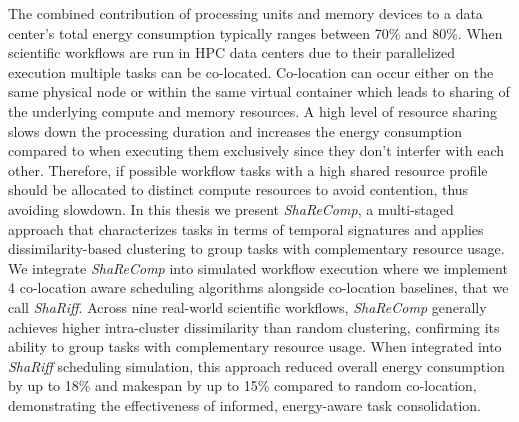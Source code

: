 \documentclass[a4paper, 11pt]{article}
\begin{document}
The combined contribution of processing units and memory devices to a data center's total energy consumption typically ranges between 70\% and 80\%. When scientific workflows are run in HPC data centers due to their parallelized execution multiple tasks can be co-located. Co-location can occur either on the same physical node or within the same virtual container which leads to sharing of the underlying compute and memory resources. A high level of resource sharing slows down the processing duration and increases the energy consumption compared to when executing them exclusively since they don't interfer with each other. Therefore, if possible workflow tasks with a high shared resource profile should be allocated to distinct compute resources to avoid contention, thus avoiding slowdown. In this thesis we present \textit{ShaReComp}, a multi-staged approach that characterizes tasks in terms of temporal signatures and applies dissimilarity-based clustering to group tasks with complementary resource usage. We integrate \textit{ShaReComp} into simulated workflow execution where we implement 4 co-location aware scheduling algorithms alongside co-location baselines, that we call \textit{ShaRiff}. Across nine real-world scientific workflows, \textit{ShaReComp} generally achieves higher intra-cluster dissimilarity than random clustering, confirming its ability to group tasks with complementary resource usage. When integrated into \textit{ShaRiff} scheduling simulation, this approach reduced overall energy consumption by up to 18\% and makespan by up to 15\% compared to random co-location, demonstrating the effectiveness of informed, energy-aware task consolidation.
\end{document}
